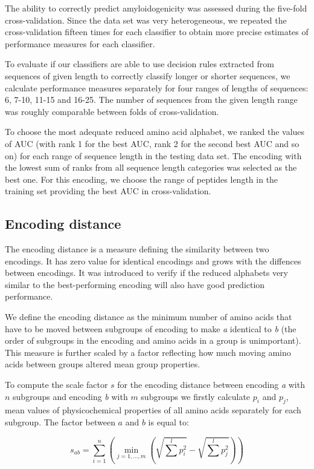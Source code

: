 \documentclass{bioinfo}
\begin{document}
\begin{methods}
The ability to correctly predict amyloidogenicity was assessed during the 
five-fold cross-validation. Since the data set was very heterogeneous, we 
repeated the cross-validation fifteen times for each classifier to obtain more 
precise estimates of performance measures for each classifier. 

  To evaluate if our classifiers are able to use decision rules extracted from 
sequences of given length to correctly classify longer or shorter sequences, we 
calculate performance measures separately for four ranges of lengths of 
sequences: 6, 7-10, 11-15 and 16-25. The number of sequences from the given 
length range was roughly comparable between folds of cross-validation.
  
  To choose the most adequate reduced amino acid alphabet, we ranked the values 
of AUC (with rank 1 for the best AUC, rank 2 for the second best AUC and so on) 
for each range of sequence length in the testing data set. The encoding with 
the lowest sum of ranks from all sequence length categories was selected as 
the best one. For this encoding, we choose the range of peptides length in the 
training set providing the best AUC in cross-validation.

\subsection{Encoding distance}
The encoding distance is a measure defining the similarity between two 
encodings. It has zero value for identical encodings and grows with the 
diffences between encodings. It was introduced to verify if the reduced 
alphabets very similar to the best-performing encoding will also have good 
prediction performance.

  We define the encoding distance as the minimum number of amino acids that 
have to be moved between subgroups of encoding to make \textit{a} identical to 
\textit{b} (the order of subgroups in the encoding and amino acids in a group 
is unimportant). This measure is further scaled by a factor reflecting how 
much moving amino acids between groups altered mean group properties. 

To compute the scale factor $s$ for the encoding distance between 
encoding \textit{a} with $n$ subgroups and encoding \textit{b} with $m$ 
subgroups we firstly calculate $p_i$ and $p_j$, mean values of physicochemical 
properties of all amino acids separately for each subgroup. The factor between 
$a$ and $b$ is equal to: 

$$
s_{ab} = \sum^n_{i = 1}  \left( \min_{j=1,\dots,m} \left(\sqrt{\sum^l p_{i}^2} 
- \sqrt{\sum^l p_{j}^2} \right) \right)
$$
 

\end{methods}
\end{document}
